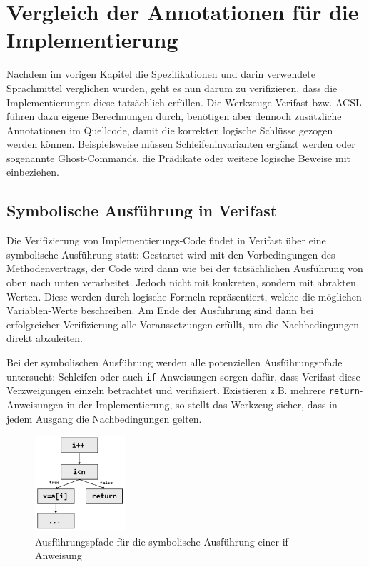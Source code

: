 ﻿\chapter{Vergleich der Annotationen für die Implementierung}

Nachdem im vorigen Kapitel die Spezifikationen und darin verwendete Sprachmittel verglichen wurden,
geht es nun darum zu verifizieren, dass die Implementierungen diese tatsächlich erfüllen.
Die Werkzeuge Verifast bzw. ACSL führen dazu eigene Berechnungen durch, benötigen aber dennoch
zusätzliche Annotationen im Quellcode, damit die korrekten logische Schlüsse gezogen 
werden können. Beispielsweise müssen Schleifeninvarianten ergänzt werden oder sogenannte
Ghost-Commands, die Prädikate oder weitere logische Beweise mit einbeziehen.

\section{Symbolische Ausführung in Verifast}

Die Verifizierung von Implementierungs-Code findet in Verifast über eine symbolische Ausführung statt:
Gestartet wird mit den Vorbedingungen des Methodenvertrags, der Code wird dann wie bei der tatsächlichen
Ausführung von oben nach unten verarbeitet. Jedoch nicht mit konkreten, sondern mit 
abrakten Werten. Diese werden durch logische Formeln repräsentiert, welche die möglichen Variablen-Werte 
beschreiben. Am Ende der Ausführung sind dann bei erfolgreicher Verifizierung alle Voraussetzungen
erfüllt, um die Nachbedingungen direkt abzuleiten.

Bei der symbolischen Ausführung werden alle potenziellen Ausführungspfade untersucht: Schleifen
oder auch \texttt{if}-Anweisungen sorgen dafür, dass Verifast diese Verzweigungen einzeln betrachtet
und verifiziert. Existieren z.B. mehrere \texttt{return}-Anweisungen in der Implementierung, so stellt
das Werkzeug sicher, dass in jedem Ausgang die Nachbedingungen gelten.

\begin{figure}
	\centering
		\includegraphics[width=0.3\textwidth]{images/symbolic_execution.png}
		\caption{Ausführungspfade für die symbolische Ausführung einer if-Anweisung}
\end{figure}


